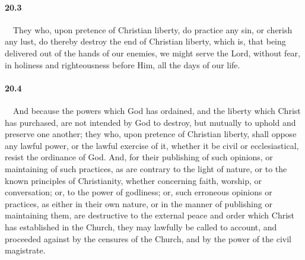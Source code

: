 \paragraph{20.3}\ \ They who, upon pretence of Christian liberty, do practice any sin, or cherish any lust, do thereby destroy the end of Christian liberty, which is, that being delivered out of the hands of our enemies, we might serve the Lord, without fear, in holiness and righteousness before Him, all the days of our life.   
\bigskip
\paragraph{20.4}\ \ And because the powers which God has ordained, and the liberty which Christ has purchased, are not intended by God to destroy, but mutually to uphold and preserve one another; they who, upon pretence of Christian liberty, shall oppose any lawful power, or the lawful exercise of it, whether it be civil or ecclesiastical, resist the ordinance of God. And, for their publishing of such opinions, or maintaining of such practices, as are contrary to the light of nature, or to the known principles of Christianity, whether concerning faith, worship, or conversation; or, to the power of godliness; or, such erroneous opinions or practices, as either in their own nature, or in the manner of publishing or maintaining them, are destructive to the external peace and order which Christ has established in the Church, they may lawfully be called to account, and proceeded against by the censures of the Church, and by the power of the civil magistrate.

